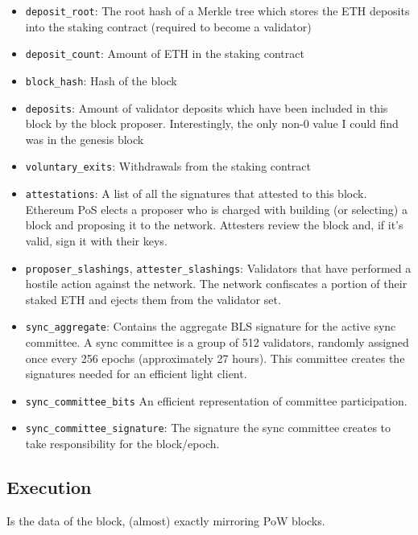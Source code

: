 \documentclass[fleqn,10pt]{olplainarticle}
\begin{document}
\begin{itemize}[noitemsep]
	\item \texttt{deposit\_root}: The root hash of a Merkle tree which stores the ETH deposits into the staking contract (required to become a validator)
	\item \texttt{deposit\_count}: Amount of ETH in the staking contract
	\item \texttt{block\_hash}: Hash of the block
	\item \texttt{deposits}: Amount of validator deposits which have been included in this block by the block proposer. Interestingly, the only non-0 value I could find was in the genesis block
	\item \texttt{voluntary\_exits}: Withdrawals from the staking contract
	\item \texttt{attestations}: A list of all the signatures that attested to this block. Ethereum PoS elects a proposer who is charged with building (or selecting) a block and proposing it to the network. Attesters review the block and, if it's valid, sign it with their keys.
	\item \texttt{proposer\_slashings}, \texttt{attester\_slashings}: Validators that have performed a hostile action against the network. The network confiscates a portion of their staked ETH and ejects them from the validator set.
	\item \texttt{sync\_aggregate}: Contains the aggregate BLS signature for the active sync committee. A sync committee is a group of 512 validators, randomly assigned once every 256 epochs (approximately 27 hours). This committee creates the signatures needed for an efficient light client.
	\item \texttt{sync\_committee\_bits} An efficient representation of committee participation.
	\item \texttt{sync\_committee\_signature}: The signature the sync committee creates to take responsibility for the block/epoch.
	
\end{itemize}

\subsection{Execution}

Is the data of the block, (almost) exactly mirroring PoW blocks.
\end{document}
